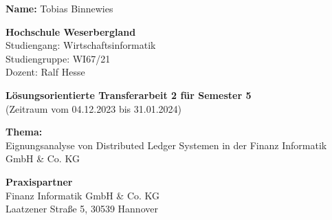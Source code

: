 
\noindent
\textbf{Name:} Tobias Binnewies

\bigbreak
\bigbreak
\bigbreak
\bigbreak
\bigbreak
\bigbreak
\bigbreak
\bigbreak


\noindent
\textbf{Hochschule Weserbergland} \\
Studiengang: Wirtschaftsinformatik \\
Studiengruppe: WI67/21 \\
Dozent: Ralf Hesse

\bigbreak
\bigbreak
\bigbreak
\bigbreak
\bigbreak
\bigbreak
\bigbreak
\bigbreak

\noindent
\textbf{Lösungsorientierte Transferarbeit 2 für Semester 5} \\
(Zeitraum vom 04.12.2023 bis 31.01.2024)

\bigbreak
\bigbreak
\bigbreak
\bigbreak

\noindent
\textbf{Thema:} \\
Eignungsanalyse von Distributed Ledger Systemen in der Finanz Informatik GmbH \& Co. KG

\bigbreak
\bigbreak
\bigbreak
\bigbreak

\noindent
\textbf{Praxispartner} \\
Finanz Informatik GmbH \& Co. KG \\
Laatzener Straße 5, 30539 Hannover

\bigbreak

\newpage

